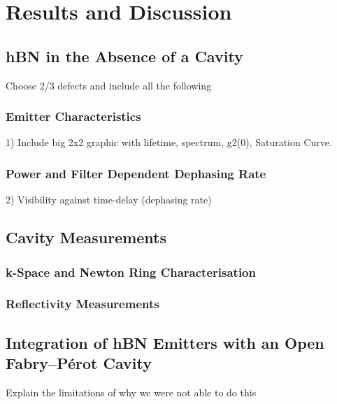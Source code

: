 \section{Results and Discussion}

\subsection{hBN in the Absence of a Cavity}

Choose 2/3 defects and include all the following

\subsubsection{Emitter Characteristics}

1) Include big 2x2 graphic with lifetime, spectrum, g2(0), Saturation Curve.

\subsubsection{Power and Filter Dependent Dephasing Rate}

2) Visibility against time-delay (dephasing rate)




\subsection{Cavity Measurements}

\subsubsection{k-Space and Newton Ring Characterisation}

\subsubsection{Reflectivity Measurements}



\subsection{Integration of hBN Emitters with an Open Fabry–Pérot Cavity}

Explain the limitations of why we were not able to do this